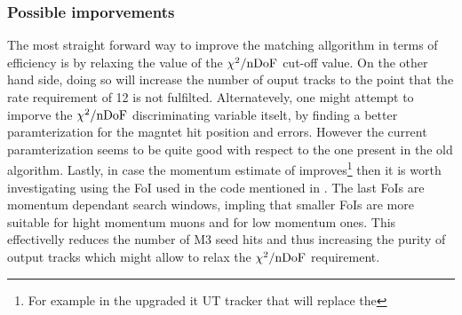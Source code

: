 \subsubsection{Possible imporvements}
The most straight forward way to improve the matching allgorithm in terms of efficiency is
by relaxing the value of the $\chi^2/{\rm nDoF}$ cut-off value. On the other hand side, doing so will increase the number
of ouput tracks to the point that the \hltone rate requirement of 12 \khz is not fulfilted.
Alternatevely, one might attempt to imporve the $\chi^2/{\rm nDoF}$ discriminating variable itselt,
by finding a better paramterization for the magntet hit position and errors. However the current
paramterization seems to be quite good with respect to the one present in the old \mvm algorithm.
Lastly, in case the momentum estimate of \ttracker improves\footnote{For example in the upgraded it
UT tracker that will replace the \ttracker} then it is worth investigating using the FoI used in the
\muonID code mentioned in \secref{}. The last FoIs are momentum dependant search windows, impling
that smaller FoIs are more suitable for hight momentum muons and \viceversa for low momentum ones.
This effectivelly reduces the number of M3 seed hits and thus increasing the purity of output tracks
which might allow to relax the $\chi^2/{\rm nDoF}$ requirement.
